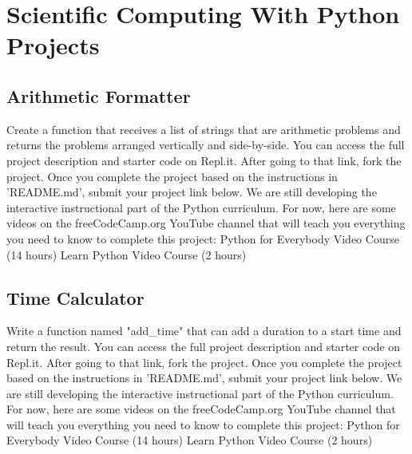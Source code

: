 \documentclass{article}%
\begin{document}
%
\newpage%
\section{Scientific Computing With Python Projects}%
\label{sec:ScientificComputingWithPythonProjects}%
\subsection{Arithmetic Formatter}%
\label{subsec:ArithmeticFormatter}%
Create a function that receives a list of strings that are arithmetic problems and returns the problems arranged vertically and side{-}by{-}side.\newline%
You can access the full project description and starter code on Repl.it.\newline%
After going to that link, fork the project. Once you complete the project based on the instructions in 'README.md', submit your project link below.\newline%
We are still developing the interactive instructional part of the Python curriculum. For now, here are some videos on the freeCodeCamp.org YouTube channel that will teach you everything you need to know to complete this project:\newline%
Python for Everybody Video Course (14 hours)\newline%
  \newline%
Learn Python Video Course (2 hours)\newline%
  \newline%

%
\subsection{Time Calculator}%
\label{subsec:TimeCalculator}%
Write a function named "add\_time" that can add a duration to a start time and return the result.\newline%
You can access the full project description and starter code on Repl.it. After going to that link, fork the project. Once you complete the project based on the instructions in 'README.md', submit your project link below.\newline%
We are still developing the interactive instructional part of the Python curriculum. For now, here are some videos on the freeCodeCamp.org YouTube channel that will teach you everything you need to know to complete this project:\newline%
Python for Everybody Video Course (14 hours)\newline%
  \newline%
Learn Python Video Course (2 hours)\newline%
  \newline%
\end{document}
